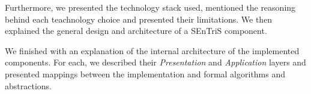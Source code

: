 Furthermore, we presented the technology stack used, mentioned the reasoning behind each teachnology choice and presented their limitations. We then explained the general design and architecture of a \gls{SEnTriS} component.

We finished with an explanation of the internal architecture of the implemented components. For each, we described their \emph{Presentation} and \emph{Application} layers and presented mappings between the implementation and formal algorithms and abstractions.